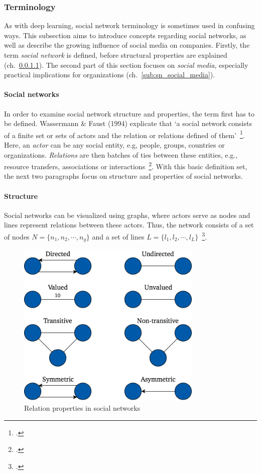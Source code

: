 \subsubsection{Terminology}
\label{sub:sn_terminology}

As with deep learning, social network terminology is sometimes used in confusing
ways.
This subsection aims to introduce concepts regarding social networks, as well
as describe the growing influence of social media on companies.
Firstly, the term \textit{social network} is defined, before structural
properties are explained (ch.~\ref{sub:sn_social_networks}).
The second part of this section focuses on \textit{social media}, especially
practical implications for organizations (ch.~\ref{sub:sn_social_media}).

\paragraph{Social networks}
\label{sub:sn_social_networks}

In order to examine social network structure and properties, the term first
has to be defined.
Wassermann \& Faust (1994) explicate that `a social network consists of a finite
set or sets of actors and the relation or relations defined of them'~\footcite[20]{Wasserman1994}.
Here, an \textit{actor} can be any social entity, e.g, people, groups, countries or
organizations.
\textit{Relations} are then batches of ties between these entities, e.g., resource
transfers, associations or interactions~\footcite{Wasserman1994}.
With this basic definition set, the next two paragraphs focus on structure and
properties of social networks.

\paragraph{Structure}

Social networks can be visualized using graphs, where actors serve as nodes
and lines represent relations between these actors.
Thus, the network consists of a set of nodes $N = \{n_1, n_2, \cdots, n_g\}$ and
a set of lines $L = \{l_1, l_2, \cdots, l_L\}$~\footcite{Wasserman1994}.

\begin{figure}[h]
  \includegraphics[height=8cm]{img/relation_properties}
  \caption{Relation properties in social networks}
\label{fig:tie_properties}
\end{figure}

